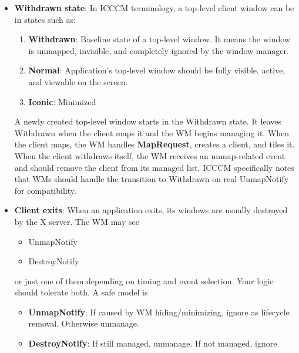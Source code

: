 \documentclass{report}
\begin{document}
\begin{itemize}
            Destruction cleanup should clear:
            \begin{itemize}
                focused client,
                last focused client,
                urgent client pointer,
                fullscreen client pointer,
                workspace client references,
                layout stack references,
                any pointer stored in monitor/screen state.
            \end{itemize}
        \item \textbf{Withdrawn state}: In ICCCM terminology, a top-level client window can be in states such as:
            \begin{enumerate}
                \item \textbf{Withdrawn}: Baseline state of a top-level window. It means the window is unmapped, invisible, and completely ignored by the window manager. 
                \item \textbf{Normal}: Application's top-level window should be fully visible, active, and viewable on the screen.
                \item \textbf{Iconic}: Minimized
            \end{enumerate}
            A newly created top-level window starts in the Withdrawn state. It leaves Withdrawn when the client maps it and the WM begins managing it.
            \bigbreak \noindent 
            When the client maps, the WM handles \textbf{MapRequest}, creates a client, and tiles it.
            \bigbreak \noindent 
            When the client withdraws itself, the WM receives an unmap-related event and should remove the client from its managed list. ICCCM specifically notes that WMs should handle the transition to Withdrawn on real UnmapNotify for compatibility.
        \item \textbf{Client exits}: When an application exits, its windows are usually destroyed by the X server. The WM may see 
            \begin{itemize}
                \item UnmapNotify
                \item DestroyNotify
            \end{itemize}
            or just one of them depending on timing and event selection. Your logic should tolerate both. A safe model is 
            \bigbreak \noindent 
            \begin{itemize}
                \item \textbf{UnmapNotify}: If caused by WM hiding/minimizing, ignore as lifecycle removal. Otherwise unmanage.
                \item \textbf{DestroyNotify}: If still managed, unmanage. If not managed, ignore.
            \end{itemize}
    \end{itemize}
\end{document}
